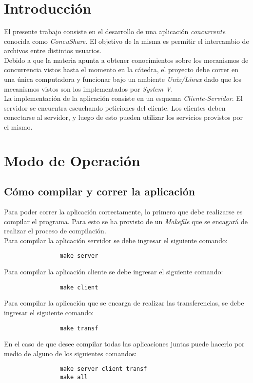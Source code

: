 \documentclass[a4paper,10pt]{article}
\title{  }
\begin{document}
	\maketitle %
	\newpage

	\tableofcontents %
	\newpage

	\section{Introducci\'on}
		El presente trabajo consiste en el desarrollo de una aplicaci\'on {\it concurrente} conocida como \emph{ConcuShare}. El objetivo de la misma
		es permitir el intercambio de archivos entre distintos usuarios. \\
		\indent Debido a que la materia apunta a obtener conocimientos sobre los mecanismos de concurrencia vistos hasta el momento en la c\'atedra, 
    el proyecto debe correr en una \'unica computadora y funcionar bajo un ambiente \emph{Unix/Linux} dado que los mecanismos vistos son los 
    implementados por \emph{System V}. \\
		\indent La implementaci\'on de la aplicaci\'on consiste en un esquema \emph{Cliente-Servidor}. El servidor se encuentra escuchando peticiones
		del cliente. Los clientes deben conectarse al servidor, y luego de esto pueden utilizar los servicios provistos por el mismo.
		\vspace{0.5cm}

	\section{Modo de Operaci\'on}

		\subsection {C\'omo compilar y correr la aplicaci\'on}
			Para poder correr la aplicaci\'on correctamente, lo primero que debe realizarse es compilar el programa. Para esto se ha provisto de un
			\emph{Makefile} que se encagar\'a de realizar el proceso de compilaci\'on. \\
			\indent Para compilar la aplicaci\'on servidor se debe ingresar el siguiente comando:
			\begin{verbatim}
				make server
			\end{verbatim}
			\indent Para compilar la aplicaci\'on cliente se debe ingresar el siguiente comando:
			\begin{verbatim}
				make client
			\end{verbatim}
			\indent Para compilar la aplicaci\'on que se encarga de realizar las transferencias, se debe ingresar el siguiente comando:
			\begin{verbatim}
				make transf
			\end{verbatim}
			\indent En el caso de que desee compilar todas las aplicaciones juntas puede hacerlo por medio de alguno de los siguientes comandos:
			\begin{verbatim}
				make server client transf
				make all
			\end{verbatim}
\end{document}
